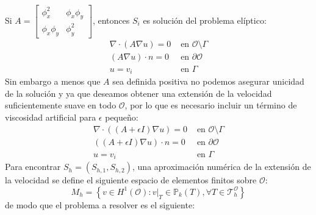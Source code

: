 Si $A=\begin{bmatrix} \phi_x^2 &  \phi_{x}\phi_{y} \\ \phi_{x}\phi_{y} & \phi_y^2 \end{bmatrix}$, entonces $S_i$ es solución del problema elíptico:
\begin{equation}
	\begin{aligned}
		\nabla \cdot (A \nabla u)=0 & \text{ en }  \mathcal{O}\setminus \Gamma \\
		(A \nabla u) \cdot n=0 &	 \text{ en }  \partial \mathcal{O}\\
		u=v_i &	 \text{ en } \Gamma
	\end{aligned}
	\label{eqn:problemaextension}
\end{equation}
Sin embargo a menos que $A$ sea definida positiva no podemos asegurar unicidad de la solución y ya que deseamos obtener una extensión de la velocidad suficientemente suave en todo $\mathcal{O}$, por lo que es necesario incluir un término de viscosidad artificial para $\epsilon$ pequeño:
\begin{equation}
	\begin{aligned}
		\nabla \cdot ((A+\epsilon I) \nabla u)=0 & \text{ en }  \mathcal{O}\setminus \Gamma \\
		((A+\epsilon I) \nabla u) \cdot n=0 &	 \text{ en }  \partial \mathcal{O}\\
		u=v_i &	 \text{ en } \Gamma
	\end{aligned}
\end{equation}
Para encontrar $S_h=(S_{h,1},S_{h,2})$, una aproximación numérica de la extensión de la velocidad se define el siguiente espacio de elementos finitos sobre $\mathcal{O}$: 
\[
M_h= \left\{
v \in H^1(\mathcal{O}):\left.v\right\vert_T \in \mathbb{P}_k(T),\forall T \in \mathcal{T}^\mathcal{O}_h
\right\}
\]
de modo que el problema a resolver es el siguiente:

